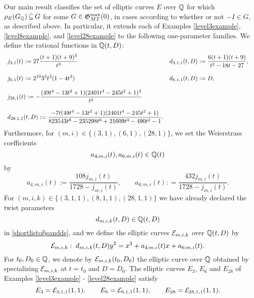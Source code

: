 Our main result classifies the set of elliptic curves $E$ over $\mathbb{Q}$ for which $\rho_E(G_{\mathbb{Q}}) \, \dot\subseteq \, G$ for some $G \in \mathfrak{G}_{MT}^{\max}(0)$, in cases according to whether or not $-I \in G$, as described above.  In particular, it extends each of Examples \ref{level3example}, \ref{level8example}, and \ref{level28example} to the following one-parameter families.  We define the rational functions in $\mathbb{Q}(t,D)$:
\begin{equation} \label{shortlistofjsandds}
\begin{array}{ll}
j_{3,1}(t) := \displaystyle 27\frac{(t+1)(t+9)^3}{t^3} & d_{3,1,1}(t,D) :=  \displaystyle \frac{6(t+1)(t+9)}{t^2 - 18t - 27}, \\
& \\
j_{6,1}(t) := \displaystyle 2^{10}3^3t^3(1-4t^3) & d_{6,1,1}(t,D) := \displaystyle D, \\
& \\
j_{28,1}(t) := \displaystyle - \frac{(49t^4 - 13t^2 + 1)(2401t^4 - 245t^2 + 1)^3}{t^2} & \\
& \\
d_{28,1,1}(t,D) :=  \displaystyle \frac{-7t(49t^4 - 13t^2 + 1)(2401t^4 - 245t^2 + 1)}{823543t^8 - 235298t^6 + 21609t^4 - 490t^2 - 1}. & 
\end{array} 
\end{equation}
Furthermore, for $(m,i) \in \{ (3,1), (6,1), (28,1) \}$, we set the Weierstrass coefficients $$a_{4;m,i}(t),a_{6;m,i}(t) \in \mathbb{Q}(t)$$ by
\begin{equation} \label{defofa4anda6}
a_{4;m,i}(t) := \frac{108j_{m,i}(t)}{1728 - j_{m,i}(t)}, \quad\quad a_{6;m,i}(t) \colon= \frac{432j_{m,i}(t)}{1728-j_{m,i}(t)}.
\end{equation}
For $(m,i,k) \in \{ (3,1,1), (8,1,1), (28,1,1) \}$ we have already declared the twist parameters $$d_{m,i,k}(t,D) \in \mathbb{Q}(t,D)$$ in \eqref{shortlistofjsandds}, and we define the elliptic curves $\mathcal{E}_{m,i,k}$ over $\mathbb{Q}(t,D)$ by
\begin{equation} \label{ellipticsurface}
\mathcal{E}_{m,i,k} : \; d_{m,i,k}(t,D) y^2 = x^3 + a_{4;m,i}(t) x + a_{6;m,i}(t).
\end{equation}
For $t_0,D_0 \in \mathbb{Q}$, we denote by $\mathcal{E}_{m,i,k}(t_0,D_0)$ the elliptic curve over $\mathbb{Q}$ obtained by specializing $\mathcal{E}_{m,i,k}$ at $t = t_0$ and $D = D_0$.  The elliptic curves $E_3$, $E_6$ and $E_{28}$ of Examples \ref{level3example} - \ref{level28example} satisfy
\[
E_3 = \mathcal{E}_{3,1,1}(1,1), \quad\quad E_6 = \mathcal{E}_{6,1,1}(1,1), \quad\quad E_{28} = \mathcal{E}_{28,1,1}(1,1).
\]

